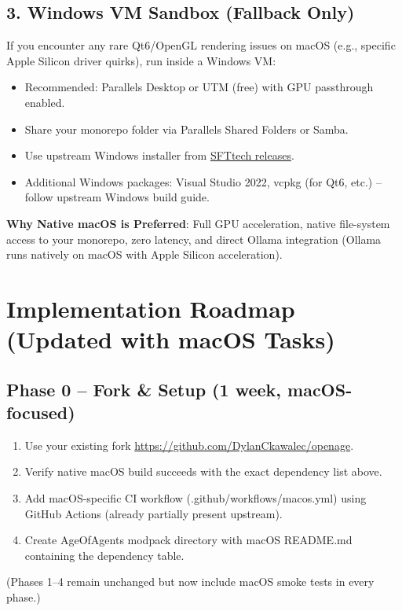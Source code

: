 \documentclass[11pt,a4paper]{article}
\begin{document}
\subsection{3. Windows VM Sandbox (Fallback Only)}
If you encounter any rare Qt6/OpenGL rendering issues on macOS (e.g., specific Apple Silicon driver quirks), run inside a Windows VM:
\begin{itemize}
    \item Recommended: Parallels Desktop or UTM (free) with GPU passthrough enabled.
    \item Share your monorepo folder via Parallels Shared Folders or Samba.
    \item Use upstream Windows installer from \href{https://github.com/SFTtech/openage/releases}{SFTtech releases}.
    \item Additional Windows packages: Visual Studio 2022, vcpkg (for Qt6, etc.) – follow upstream Windows build guide.
\end{itemize}

\textbf{Why Native macOS is Preferred}: Full GPU acceleration, native file-system access to your monorepo, zero latency, and direct Ollama integration (Ollama runs natively on macOS with Apple Silicon acceleration).

\section{Implementation Roadmap (Updated with macOS Tasks)}

\subsection{Phase 0 – Fork \& Setup (1 week, macOS-focused)}
\begin{enumerate}
    \item Use your existing fork \href{https://github.com/DylanCkawalec/openage}{https://github.com/DylanCkawalec/openage}.
    \item Verify native macOS build succeeds with the exact dependency list above.
    \item Add macOS-specific CI workflow (.github/workflows/macos.yml) using GitHub Actions (already partially present upstream).
    \item Create AgeOfAgents modpack directory with macOS README.md containing the dependency table.
\end{enumerate}

(Phases 1–4 remain unchanged but now include macOS smoke tests in every phase.)
\end{document}
